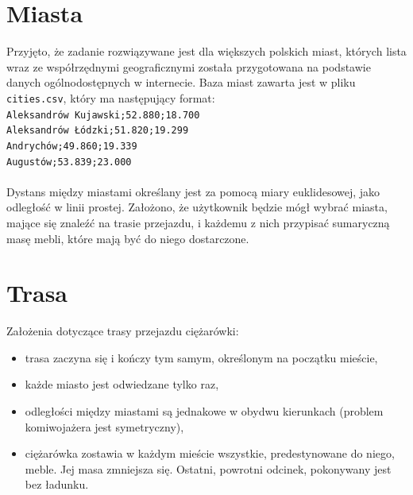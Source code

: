\documentclass[12pt, oneside, final]{report}
\begin{document}
\section{Miasta}
Przyjęto, że zadanie rozwiązywane jest dla większych polskich miast, których lista wraz ze współrzędnymi geograficznymi została przygotowana na podstawie danych ogólnodostępnych w internecie. Baza miast zawarta jest w pliku \texttt{cities.csv}, który ma następujący format:\\
\texttt{\hspace*{2em}Aleksandrów Kujawski;52.880;18.700\\
	\hspace*{2em}Aleksandrów Łódzki;51.820;19.299\\
	\hspace*{2em}Andrychów;49.860;19.339\\
	\hspace*{2em}Augustów;53.839;23.000\\}\\
Dystans między miastami określany jest za pomocą miary euklidesowej, jako odległość w linii prostej. Założono, że użytkownik będzie mógł wybrać miasta, mające się znaleźć na trasie przejazdu, i każdemu z nich przypisać sumaryczną masę mebli, które mają być do niego dostarczone.

\section{Trasa}
Założenia dotyczące trasy przejazdu ciężarówki:
\begin{itemize}
\item trasa zaczyna się i kończy tym samym, określonym na początku mieście,
\item każde miasto jest odwiedzane tylko raz,
\item odległości między miastami są jednakowe w obydwu kierunkach (problem komiwojażera jest symetryczny),
\item ciężarówka zostawia w każdym mieście wszystkie, predestynowane do niego, meble. Jej masa zmniejsza się. Ostatni, powrotni odcinek, pokonywany jest bez ładunku.
\end{itemize}
\end{document}
